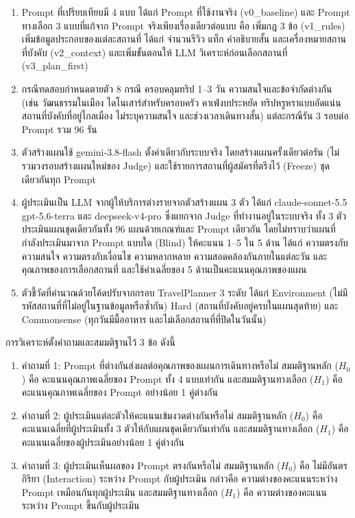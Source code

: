 \begin{enumerate}[label=(\arabic*),leftmargin=0pt,itemindent=\dimexpr\parindent+\parenlabelwidth+1em\relax,align=right,labelwidth=\parenlabelwidth,labelsep=1em]
\item Prompt ที่เปรียบเทียบมี 4 แบบ ได้แก่ Prompt ที่ใช้งานจริง (v0\_baseline) และ Prompt ทางเลือก 3 แบบที่แก้จาก Prompt จริงเพียงเรื่องเดียวต่อแบบ คือ เพิ่มกฎ 3 ข้อ (v1\_rules) เพิ่มข้อมูลประกอบของแต่ละสถานที่ ได้แก่ จำนวนรีวิว แท็ก คำอธิบายสั้น และเครื่องหมายสถานที่บังคับ (v2\_context) และเพิ่มขั้นตอนให้ LLM วิเคราะห์ก่อนเลือกสถานที่ (v3\_plan\_first)
\item กรณีทดสอบกำหนดตายตัว 8 กรณี ครอบคลุมทริป 1--3 วัน ความสนใจและข้อจำกัดต่างกัน (เช่น วัฒนธรรมในเมือง ไดโนเสาร์สำหรับครอบครัว คาเฟ่งบประหยัด ทริปหรูหราแบบอัดแน่น สถานที่บังคับที่อยู่ไกลเมือง ไม่ระบุความสนใจ และช่วงเวลาเดินทางสั้น) แต่ละกรณีรัน 3 รอบต่อ Prompt รวม 96 รัน
\item ตัวสร้างแผนใช้ gemini-3.8-flash ตั้งค่าเดียวกับระบบจริง โดยสร้างแผนครั้งเดียวต่อรัน (ไม่รวมวงรอบสร้างแผนใหม่ของ Judge) และใช้รายการสถานที่ผู้สมัครที่ตรึงไว้ (Freeze) ชุดเดียวกันทุก Prompt
\item ผู้ประเมินเป็น LLM จากผู้ให้บริการต่างรายจากตัวสร้างแผน 3 ตัว ได้แก่ claude-sonnet-5.5 gpt-5.6-terra และ deepseek-v4-pro ซึ่งแยกจาก Judge ที่ทำงานอยู่ในระบบจริง ทั้ง 3 ตัวประเมินแผนชุดเดียวกันทั้ง 96 แผนด้วยเกณฑ์และ Prompt เดียวกัน โดยไม่ทราบว่าแผนที่กำลังประเมินมาจาก Prompt แบบใด (Blind) ให้คะแนน 1--5 ใน 5 ด้าน ได้แก่ ความตรงกับความสนใจ ความตรงกับเงื่อนไข ความหลากหลาย ความสอดคล้องกันภายในแต่ละวัน และคุณภาพของการเลือกสถานที่ และใช้ค่าเฉลี่ยของ 5 ด้านเป็นคะแนนคุณภาพของแผน
\item ตัวชี้วัดที่คำนวณด้วยโค้ดปรับจากกรอบ TravelPlanner 3 ระดับ ได้แก่ Environment (ไม่มีรหัสสถานที่ที่ไม่อยู่ในฐานข้อมูลหรือซ้ำกัน) Hard (สถานที่บังคับอยู่ครบในแผนสุดท้าย) และ Commonsense (ทุกวันมีมื้ออาหาร และไม่เลือกสถานที่ที่ปิดในวันนั้น)
\end{enumerate}

การวิเคราะห์ตั้งคำถามและสมมติฐานไว้ 3 ข้อ ดังนี้

\begin{enumerate}[label=(\arabic*),leftmargin=0pt,itemindent=\dimexpr\parindent+\parenlabelwidth+1em\relax,align=right,labelwidth=\parenlabelwidth,labelsep=1em]
\item คำถามที่ 1: Prompt ที่ต่างกันส่งผลต่อคุณภาพของแผนการเดินทางหรือไม่ สมมติฐานหลัก ($H_0$) คือ คะแนนคุณภาพเฉลี่ยของ Prompt ทั้ง 4 แบบเท่ากัน และสมมติฐานทางเลือก ($H_1$) คือ คะแนนคุณภาพเฉลี่ยของ Prompt อย่างน้อย 1 คู่ต่างกัน
\item คำถามที่ 2: ผู้ประเมินแต่ละตัวให้คะแนนเข้มงวดต่างกันหรือไม่ สมมติฐานหลัก ($H_0$) คือ คะแนนเฉลี่ยที่ผู้ประเมินทั้ง 3 ตัวให้กับแผนชุดเดียวกันเท่ากัน และสมมติฐานทางเลือก ($H_1$) คือ คะแนนเฉลี่ยของผู้ประเมินอย่างน้อย 1 คู่ต่างกัน
\item คำถามที่ 3: ผู้ประเมินเห็นผลของ Prompt ตรงกันหรือไม่ สมมติฐานหลัก ($H_0$) คือ ไม่มีอันตรกิริยา (Interaction) ระหว่าง Prompt กับผู้ประเมิน กล่าวคือ ความต่างของคะแนนระหว่าง Prompt เหมือนกันทุกผู้ประเมิน และสมมติฐานทางเลือก ($H_1$) คือ ความต่างของคะแนนระหว่าง Prompt ขึ้นกับผู้ประเมิน
\end{enumerate}

